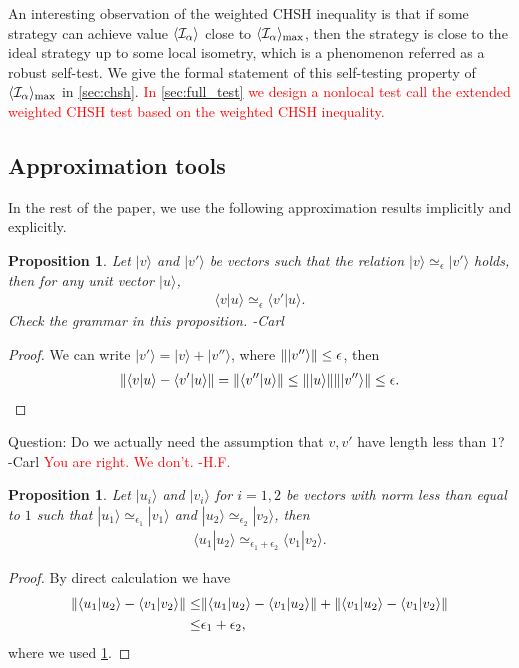 \documentclass[11pt,letterpaper]{article}
\newcommand{\ket}[1]{|#1\rangle}
\newcommand{\braket}[2]{\langle#1|#2\rangle}
\DeclarePairedDelimiter{\norm}{\lVert}{\rVert}
\DeclarePairedDelimiter{\ip}{\langle}{\rangle}
\newcommand{\1}{\mathbb{1}}
\newcommand{\I}{\mathcal{I}}
\newcommand{\ep}{\epsilon}
\newcommand{\appd}[1]{\simeq_{#1}}
\def\carl#1{{\color{blue} #1 -Carl}}
\newcommand{\hf}[1]{\textcolor{red}{#1}}
\newcommand{\hfc}[1]{\textcolor{red}{#1 -H.F.}}
\newtheorem{proposition}[theorem]{Proposition}
\theoremstyle{definition}
\begin{document}
An interesting observation of the weighted CHSH inequality is that if some strategy can achieve 
value $\ip{\I_\alpha}$ close to $\ip{\I_\alpha}_{\max}$, then the strategy is close to the ideal 
strategy up to some local isometry, 
which is a phenomenon referred as a robust self-test.
We give the formal statement of this self-testing property of $\ip{\I_\alpha}_{\max}$ in \cref{sec:chsh}.
\hf{In \cref{sec:full_test} we design
a nonlocal test call the extended weighted CHSH test based on the weighted CHSH inequality.}

\subsection{Approximation tools}
In the rest of the paper, we use the following approximation results implicitly and explicitly.
\begin{proposition}
	\label{prop:inner_pd}
	Let $\ket{v}$ and $\ket{v'}$ be vectors such that the relation $\ket{v} \appd{\epsilon} \ket{v'}$ holds,
	then for any unit vector $\ket{u}$,
	\begin{align*}
		 \braket{v}{u} \appd{\ep} \braket{v'}{u} .
	\end{align*}	
	\carl{Check the grammar in this proposition.}
\end{proposition}
\begin{proof}
	We can write $\ket{v'} = \ket{v} + \ket{v''}$, where $\norm{\ket{v''}} \leq \epsilon$,
	then
	\begin{align*}
	\norm{ \braket{v}{u} - \braket{v'}{u} } = \norm{\braket{v''}{u}} \leq \norm{\ket{u}}\norm{\ket{v''}} \leq \epsilon.
	\end{align*}
\end{proof}
\carl{Question: Do we actually need the assumption that $v,v'$ have length less than $1$?}
\hfc{You are right. We don't.}
\begin{proposition}
	Let $\ket{u_i}$ and $\ket{v_i}$ for $i = 1,2$ be vectors with norm less than equal to $1$
	such that 
	$\ket{u_1} \appd{\ep_1} \ket{v_1}$ and $\ket{u_2} \appd{\ep_2} \ket{v_2}$,
	then 
	\begin{align*}
		\braket{u_1}{u_2} \appd{\ep_1+ \ep_2} \braket{v_1}{v_2}.
	\end{align*}
\end{proposition}
\begin{proof}
	By direct calculation we have
	\begin{align*}
		\norm{ \braket{u_1}{u_2} - \braket{v_1}{v_2}} \leq &\norm{\braket{u_1}{u_2} - \braket{v_1}{u_2}}
		+ \norm{\braket{v_1}{u_2} - \braket{v_1}{v_2}} \\
		\leq & \ep_1 + \ep_2,
	\end{align*}
	where we used \cref{prop:inner_pd}.
\end{proof}
\end{document}
